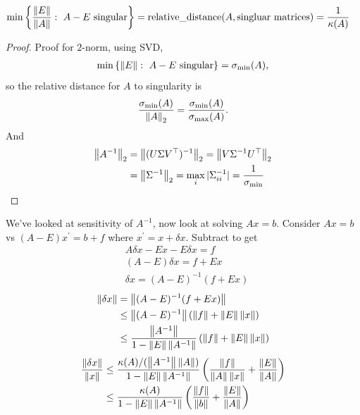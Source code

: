 \documentclass[11pt]{article}
\numberwithin{equation}{section}
\begin{document}
\begin{theorem}
    \begin{align*}
        \min\left\{ \frac{\left\| E \right\|}{\left\| A \right\|}: \ A-E \text{ singular} \right\} &= \operatorname{relative\_distance}(A, \text{singluar matrices}) = \frac{1}{\kappa(A)}
    \end{align*}
    \begin{proof}
        Proof for $2$-norm, using SVD, \begin{align*}
            \min \left\{ \left\| E \right\| : \ A-E \text{ singular} \right\} = \sigma_{\mathrm{min}}(A),
        \end{align*}
        so the relative distance for $A$ to singularity is \begin{align*}
            \frac{\sigma_{\mathrm{min}}(A)}{\left\| A \right\|_2} = \frac{\sigma_{\mathrm{min}}(A)}{\sigma_{\mathrm{max}}(A)}.
        \end{align*}
        And \begin{align*}
            \left\| A^{-1} \right\|_2 &= \left\| (U\Sigma V^\top)^{-1} \right\|_2 = \left\| V\Sigma^{-1} U^\top \right\|_2 \\
            &= \left\| \Sigma^{-1} \right\|_2 = \max_i |\Sigma_{ii}^{-1}| = \frac{1}{\sigma_{\mathrm{min}}}
        \end{align*}
    \end{proof}
\end{theorem}

We've looked at sensitivity of $A^{-1}$, now look at solving $Ax=b$. Consider $Ax = b$ vs $(A-E) x^\prime = b+f$ where $x^\prime = x+\delta x$.
Subtract to get \begin{align*}
    &A\delta x - Ex - E\delta x = f\\
    &(A-E)\delta x = f + Ex \\
    &\delta x = (A-E)^{-1}(f + Ex)
\end{align*}
\begin{align*}
    \left\| \delta x \right\| &= \left\| (A-E)^{-1}(f + Ex) \right\| \\
    &\leq \left\| (A-E)^{-1} \right\| \left( \left\| f \right\|+\left\| E \right\|\left\| x \right\| \right) \\
    &\leq \frac{\left\| A^{-1} \right\|}{1-\left\| E \right\|\left\| A^{-1} \right\|}\left( \left\| f \right\|+\left\| E \right\|\left\| x \right\| \right)
\end{align*}
\begin{align*}
    \frac{\left\| \delta x \right\|}{\left\| x \right\|} &\leq \frac{\kappa(A)/(\left\| A^{-1} \right\|\left\| A \right\|)}{1-\left\| E \right\|\left\| A^{-1} \right\|}\left( \frac{\left\| f \right\|}{\left\| A \right\|\left\| x \right\|} + \frac{\left\| E \right\|}{\left\| A \right\|} \right) \\
    &\leq \frac{\kappa(A)}{1-\left\| E \right\|\left\| A^{-1} \right\|}\left( \frac{\left\| f \right\|}{\left\| b \right\|} + \frac{\left\| E \right\|}{\left\| A \right\|} \right)
\end{align*}
\end{document}
